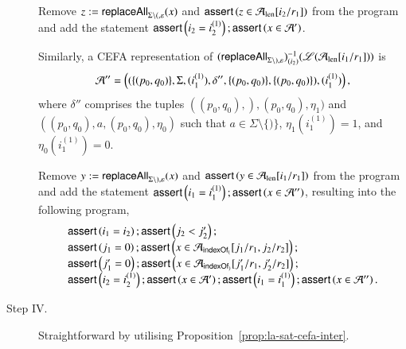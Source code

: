 \begin{example}
\begin{description}
Remove  $z:= \mathsf{replaceAll}_{\Sigma \setminus (, \varepsilon}(x)$ and $\textsf{assert}\left(z \in \mathcal{A}_{\rm len}[i_2/r_1]\right)$ from the program and add the statement $\textsf{assert}\left(i_2=i^{(1)}_2\right);\textsf{assert}\left(x \in \mathcal{A}'\right)$. 

Similarly, a CEFA representation of $(\mathsf{replaceAll}_{\Sigma \setminus ), \varepsilon})^{-1}_{(i_2)}(\mathscr{L}(\mathcal{A}_{\rm len}[i_1/r_1]))$ is  
\[\mathcal{A}'' = \left((\{(p_0, q_0)\}, \Sigma, (i^{(1)}_1), \delta'', \{(p_0, q_0)\}, \{(p_0, q_0)\}), (i^{(1)}_1)\right),\]
%
where $\delta''$ comprises the tuples $((p_0,q_0), ), (p_0,q_0), \eta_1)$ and $((p_0,q_0), a, (p_0,q_0), \eta_0)$ such that $a \in \Sigma \setminus \{)\}$, $\eta_1(i^{(1)}_1)=1$, and $\eta_0(i^{(1)}_1)=0$. 

Remove  $y:= \mathsf{replaceAll}_{\Sigma \setminus ), \varepsilon}(x)$ and $\textsf{assert}\left(y \in \mathcal{A}_{\rm len}[i_1/r_1]\right)$ from the program and add the statement $\textsf{assert}\left(i_1=i^{(1)}_1\right); \textsf{assert}\left(x \in \mathcal{A}''\right)$, resulting into the following program,
\[
\begin{array}{l}
\textsf{assert}\left(i_1 = i_2\right); \textsf{assert}\left( j_2 < j'_2\right);\\
\textsf{assert}\left(j_1 = 0\right); \textsf{assert}\left(x \in \mathcal{A}_{\mathsf{indexOf}_{(}}[j_1/r_1, j_2/r_2]\right);  \\
\textsf{assert}\left(j'_1 = 0\right); \textsf{assert}\left(x \in \mathcal{A}_{\mathsf{indexOf}_{)}}[j'_1/r_1, j'_2/r_2]\right);\\
\textsf{assert}\left(i_2=i^{(1)}_2\right); \textsf{assert}\left(x \in \mathcal{A}'\right); \textsf{assert}\left(i_1=i^{(1)}_1\right); \textsf{assert}\left(x \in \mathcal{A}''\right).
\end{array}
\] 
%
\item[Step IV.]  Straightforward by utilising Proposition~\ref{prop:la-sat-cefa-inter}. 
\end{description}

\end{example}





